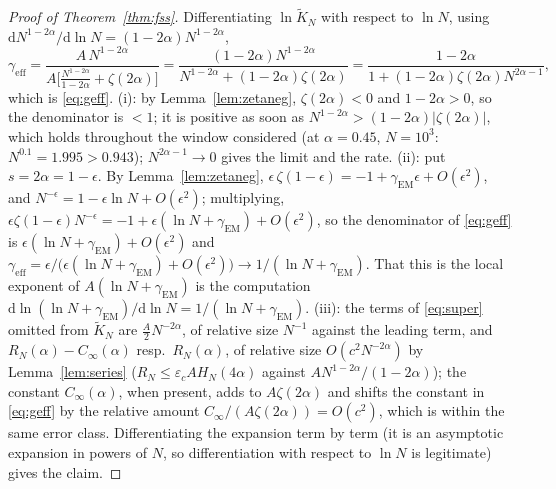 \documentclass[11pt,reqno]{amsart}
\theoremstyle{plain}
\theoremstyle{definition}
\theoremstyle{remark}
\numberwithin{equation}{section}
\newcommand{\dd}{\mathrm{d}}
\newcommand{\geff}{\gamma_{\mathrm{eff}}}
\begin{document}
\begin{proof}[Proof of Theorem~\ref{thm:fss}]
Differentiating $\ln\widetilde K_N$ with respect to $\ln N$, using $\dd N^{1-2\alpha}/\dd\ln N=(1-2\alpha)N^{1-2\alpha}$,
\[
\geff=\frac{A\,N^{1-2\alpha}}{A\bigl[\frac{N^{1-2\alpha}}{1-2\alpha}+\zeta(2\alpha)\bigr]}
=\frac{(1-2\alpha)N^{1-2\alpha}}{N^{1-2\alpha}+(1-2\alpha)\zeta(2\alpha)}
=\frac{1-2\alpha}{1+(1-2\alpha)\zeta(2\alpha)N^{2\alpha-1}},
\]
which is \eqref{eq:geff}. (i): by Lemma~\ref{lem:zetaneg}, $\zeta(2\alpha)<0$ and $1-2\alpha>0$, so the denominator is $<1$; it is positive as soon as $N^{1-2\alpha}>(1-2\alpha)|\zeta(2\alpha)|$, which holds throughout the window considered (at $\alpha=0.45$, $N=10^3$: $N^{0.1}=1.995>0.943$); $N^{2\alpha-1}\to0$ gives the limit and the rate. (ii): put $s=2\alpha=1-\epsilon$. By Lemma~\ref{lem:zetaneg}, $\epsilon\,\zeta(1-\epsilon)=-1+\gamma_{\mathrm{EM}}\epsilon+O(\epsilon^2)$, and $N^{-\epsilon}=1-\epsilon\ln N+O(\epsilon^2)$; multiplying, $\epsilon\zeta(1-\epsilon)N^{-\epsilon}=-1+\epsilon(\ln N+\gamma_{\mathrm{EM}})+O(\epsilon^2)$, so the denominator of \eqref{eq:geff} is $\epsilon(\ln N+\gamma_{\mathrm{EM}})+O(\epsilon^2)$ and $\geff=\epsilon/\bigl(\epsilon(\ln N+\gamma_{\mathrm{EM}})+O(\epsilon^2)\bigr)\to1/(\ln N+\gamma_{\mathrm{EM}})$. That this is the local exponent of $A(\ln N+\gamma_{\mathrm{EM}})$ is the computation $\dd\ln(\ln N+\gamma_{\mathrm{EM}})/\dd\ln N=1/(\ln N+\gamma_{\mathrm{EM}})$. (iii): the terms of \eqref{eq:super} omitted from $\widetilde K_N$ are $\frac A2N^{-2\alpha}$, of relative size $N^{-1}$ against the leading term, and $R_N(\alpha)-C_\infty(\alpha)$ resp.\ $R_N(\alpha)$, of relative size $O(c^2N^{-2\alpha})$ by Lemma~\ref{lem:series} ($R_N\le\varepsilon_cAH_N(4\alpha)$ against $AN^{1-2\alpha}/(1-2\alpha)$); the constant $C_\infty(\alpha)$, when present, adds to $A\zeta(2\alpha)$ and shifts the constant in \eqref{eq:geff} by the relative amount $C_\infty/(A\zeta(2\alpha))=O(c^2)$, which is within the same error class. Differentiating the expansion term by term (it is an asymptotic expansion in powers of $N$, so differentiation with respect to $\ln N$ is legitimate) gives the claim.
\end{proof}
\end{document}
